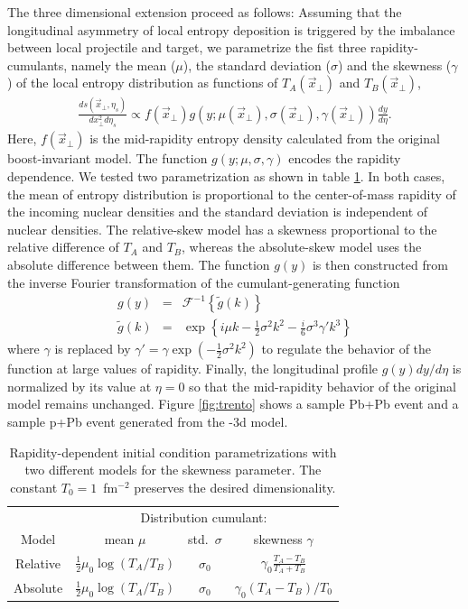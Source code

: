 \documentclass[3p,times,twocolumn]{elsarticle}
\begin{document}
The three dimensional extension proceed as  follows: 
Assuming that the longitudinal asymmetry of local entropy deposition is triggered by the imbalance between local projectile and target, we parametrize the fist three rapidity-cumulants, namely the mean ($\mu$), the standard deviation ($\sigma$) and the skewness ($\gamma$) of the local entropy distribution as functions of $T_A(\vec{x}_{\perp})$ and $T_B(\vec{x}_{\perp})$,
\begin{eqnarray}
\frac{ds(\vec{x}_{\perp}, \eta_s)}{dx_{\perp}^2 d\eta_s} \propto f(\vec{x}_{\perp})g(y; \mu(\vec{x}_{\perp}), \sigma(\vec{x}_{\perp}), \gamma(\vec{x}_{\perp}))\frac{dy}{d\eta}.
\end{eqnarray}
Here, $f(\vec{x}_{\perp})$ is the  mid-rapidity entropy density calculated from the original boost-invariant model. The function $g(y; \mu, \sigma, \gamma)$ encodes the rapidity dependence.
We tested two parametrization as shown in table \ref{tab:parametrization}.
In both cases, the mean of entropy distribution is proportional to the center-of-mass rapidity of the incoming nuclear densities and the standard deviation is independent of nuclear densities. 
The relative-skew model has a skewness proportional to the relative difference of $T_A$ and $T_B$, whereas the absolute-skew model uses the absolute difference between them.
The function $g(y)$ is then constructed from the inverse Fourier transformation of the cumulant-generating function
\begin{eqnarray}
g(y) &=& \mathcal{F}^{-1}\left\lbrace\tilde{g}(k)\right\rbrace \\
\tilde{g}(k) &=& \exp \left\lbrace i\mu k - \frac{1}{2}\sigma^2 k^2 - \frac{i}{6}\sigma^3 \gamma'k^3\right\rbrace
\end{eqnarray}
where $\gamma$ is replaced by $\gamma' = \gamma\exp(-\frac{1}{2}\sigma^2k^2)$ to regulate the behavior of the function at large values of rapidity.
Finally, the longitudinal profile $g(y)dy/d\eta$ is normalized by its value at $\eta=0$ so that the mid-rapidity behavior of the original model remains unchanged.
Figure \ref{fig:trento} shows a sample Pb+Pb event and a sample p+Pb event generated from the \trento-3d model.

\begin{table}
  \caption{
    \label{tab:parametrization}
    Rapidity-dependent initial condition parametrizations with two different models for the skewness parameter. The constant $T_0 = 1$~fm$^{-2}$ preserves the desired dimensionality.
  }
  \begin{tabular}{cccc}
\hline\hline
      & \multicolumn{3}{c}{Distribution cumulant:} \\
      Model & \multicolumn{1}{c}{mean $\mu$} & \multicolumn{1}{c}{std.\ $\sigma$} & \multicolumn{1}{c}{skewness $\gamma$} \\
\hline
        Relative  & $\frac{1}{2} \mu_0 \log(T_A/T_B)$ & $\sigma_0$ & $\gamma_0 \frac{T_A - T_B}{T_A + T_B}$ \smallskip \\
        Absolute & $\frac{1}{2} \mu_0 \log(T_A/T_B)$  & $\sigma_0$ & $\gamma_0 (T_A - T_B)/T_0$ \\
\hline\hline
  \end{tabular}
\end{table}
\end{document}
